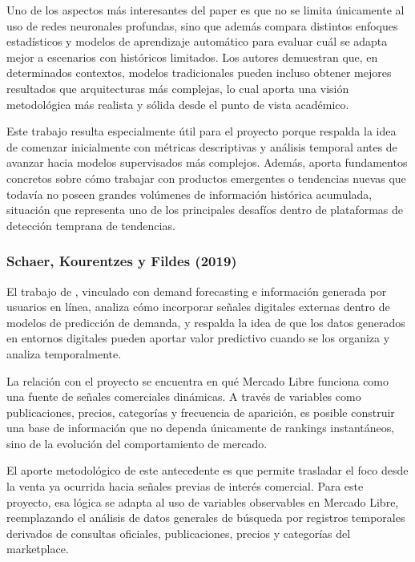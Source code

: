 Uno de los aspectos más interesantes del paper es que no se limita únicamente al uso de redes neuronales profundas, sino que además compara distintos enfoques estadísticos y modelos de aprendizaje automático para evaluar cuál se adapta mejor a escenarios con históricos limitados. Los autores demuestran que, en determinados contextos, modelos tradicionales pueden incluso obtener mejores resultados que arquitecturas más complejas, lo cual aporta una visión metodológica más realista y sólida desde el punto de vista académico.

Este trabajo resulta especialmente útil para el proyecto porque respalda la idea de comenzar inicialmente con métricas descriptivas y análisis temporal antes de avanzar hacia modelos supervisados más complejos. Además, aporta fundamentos concretos sobre cómo trabajar con productos emergentes o tendencias nuevas que todavía no poseen grandes volúmenes de información histórica acumulada, situación que representa uno de los principales desafíos dentro de plataformas de detección temprana de tendencias.

\subsubsection*{Schaer, Kourentzes y Fildes (2019)}

El trabajo de \textcite{SchaerKourentzesFildes2019}, vinculado con demand forecasting e información generada por usuarios en línea, analiza cómo incorporar señales digitales externas dentro de modelos de predicción de demanda, y respalda la idea de que los datos generados en entornos digitales pueden aportar valor predictivo cuando se los organiza y analiza temporalmente.

La relación con el proyecto se encuentra en qué Mercado Libre funciona como una fuente de señales comerciales dinámicas. A través de variables como publicaciones, precios, categorías y frecuencia de aparición, es posible construir una base de información que no dependa únicamente de rankings instantáneos, sino de la evolución del comportamiento de mercado.

El aporte metodológico de este antecedente es que permite trasladar el foco desde la venta ya ocurrida hacia señales previas de interés comercial. Para este proyecto, esa lógica se adapta al uso de variables observables en Mercado Libre, reemplazando el análisis de datos generales de búsqueda por registros temporales derivados de consultas oficiales, publicaciones, precios y categorías del marketplace.

